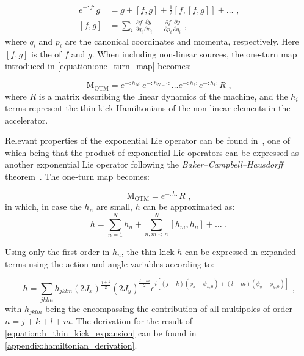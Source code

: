 \begin{equation}
    \begin{aligned}
        e^{-:f:} g          &= g + \left[f, g\right] + \frac{1}{2} \left[f, \left[f, g \right] \right] + \ldots \text{ ,} \\
        \left[ f, g \right] &= \sum_i \frac{\partial f}{\partial q_i} \frac{\partial g}{\partial p_i} - \frac{\partial f}{\partial p_i} \frac{\partial g}{\partial q_i} \text{ ,}
    \end{aligned}
    \label{equation:lie_operator}
\end{equation}
where \(q_i\) and \(p_i\) are the canonical coordinates and momenta, respectively.
Here \(\left[ f, g \right]\) is the  of \(f\) and \(g\).
When including non-linear sources, the one-turn map introduced in \cref{equation:one_turn_map} becomes:

\begin{equation}
    \mathrm{M_{OTM}} =e^{-:h_N:} e^{-:h_{N-1}:} \ldots e^{-:h_2:} e^{-:h_1:} R \text{ ,}
    \label{equation:one_turn_map_non_linear}
\end{equation}
where \(R\) is a matrix describing the linear dynamics of the machine, and the \(h_i\) terms represent the thin kick Hamiltonians of the non-linear elements in the accelerator.
\break

Relevant properties of the exponential Lie operator can be found in~\cite{PHD:Tomas, PHD:Franchi}, one of which being that the product of exponential Lie operators can be expressed as another exponential Lie operator following the \emph{Baker–Campbell–Hausdorff} theorem~\cite{BOOK:Hall:Lie_Group_Algebra_Representations}.
The one-turn map becomes:

\begin{equation}
    \mathrm{M_{OTM}} = e^{-:h:} R \text{ ,}
    \label{equation:Campbell_Baker_Hausdorff_theorem}
\end{equation}
in which, in case the \(h_n\) are small, \(h\) can be approximated as:
\begin{equation}
    h = \sum_{n=1}^N h_n + \sum_{n, m<n}^N \left[ h_m, h_n \right] + \ldots \text{ .}
    \label{equation:h_thin_kick_approximation}
\end{equation}

Using only the first order in \(h_n\), the thin kick \(h\) can be expressed in expanded terms using the action and angle variables according to:

\begin{equation}
    h = \sum_{jklm} h_{jklm} \left( 2 J_x \right)^{\frac{j+k}{2}} \left( 2 J_y \right)^{\frac{l+m}{2}} e^{i \left[ \left(j-k\right) \left(\phi_x - \phi_{x,0} \right) + \left(l-m\right) \left(\phi_y - \phi_{y,0} \right) \right]} \text{ ,}
    \label{equation:h_thin_kick_expansion}
\end{equation}
with \(h_{jklm}\) being the  encompassing the contribution of all multipoles of order \(n = j + k + l + m\). 
The derivation for the result of \cref{equation:h_thin_kick_expansion} can be found in \cref{appendix:hamiltonian_derivation}.

